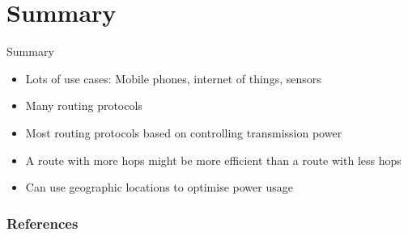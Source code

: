 \documentclass{beamer}
\begin{document}
\section{Summary}
\frame{\tableofcontents[currentsection]}
\begin{frame}{Summary}
\begin{itemize}
    \item Lots of use cases: Mobile phones, internet of things, sensors
    \item Many routing protocols
    \item Most routing protocols based on controlling transmission power
    \item A route with more hops might be more efficient than a route with less hops
    \item Can use geographic locations to optimise power usage
\end{itemize}
\end{frame}

\begin{frame}[allowframebreaks]
\frametitle{References}


\end{frame}
\end{document}

